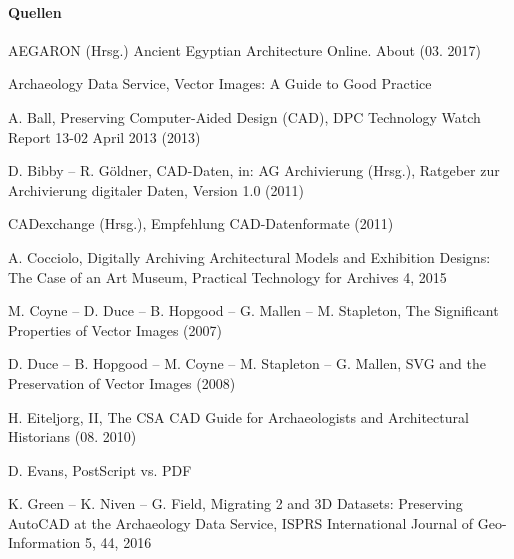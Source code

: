 \paragraph{Quellen}
\begin{flushleft}
AEGARON (Hrsg.) Ancient Egyptian Architecture Online. About (03. 2017) 

Archaeology Data Service, Vector Images: A Guide to Good Practice 

A. Ball, Preserving Computer-Aided Design (CAD), DPC Technology Watch Report 13-02 April 2013 (2013) 

D. Bibby -- R. Göldner, CAD-Daten, in: AG Archivierung (Hrsg.), Ratgeber zur Archivierung digitaler Daten, Version 1.0 (2011) 

CADexchange (Hrsg.), Empfehlung CAD-Datenformate (2011) 

A. Cocciolo, Digitally Archiving Architectural Models and Exhibition Designs: The Case of an Art Museum,  Practical Technology for Archives 4, 2015 

M. Coyne -- D. Duce -- B. Hopgood -- G. Mallen --  M. Stapleton, The Significant Properties of Vector Images (2007) 

D. Duce -- B. Hopgood -- M. Coyne -- M. Stapleton -- G. Mallen, SVG and the Preservation of Vector Images (2008) 

H. Eiteljorg, II, The CSA CAD Guide for Archaeologists and Architectural Historians (08. 2010) 

D. Evans, PostScript vs. PDF 

K. Green -- K. Niven -- G. Field, Migrating 2 and 3D Datasets: Preserving AutoCAD at the Archaeology Data Service, ISPRS International Journal of Geo-Information 5, 44, 2016 


\end{flushleft}
